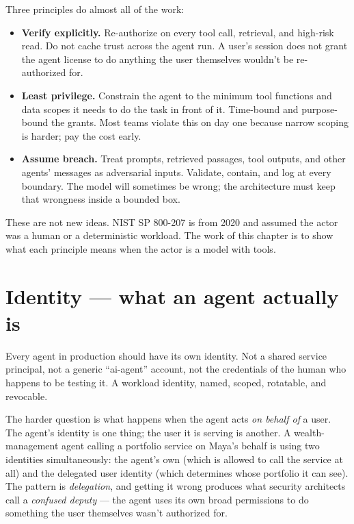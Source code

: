 Three principles do almost all of the work:

\begin{itemize}
\item \textbf{Verify explicitly.} Re-authorize on every tool call, retrieval, and high-risk read. Do not cache trust across the agent run. A user's session does not grant the agent license to do anything the user themselves wouldn't be re-authorized for.
\item \textbf{Least privilege.} Constrain the agent to the minimum tool functions and data scopes it needs to do the task in front of it. Time-bound and purpose-bound the grants. Most teams violate this on day one because narrow scoping is harder; pay the cost early.
\item \textbf{Assume breach.} Treat prompts, retrieved passages, tool outputs, and other agents' messages as adversarial inputs. Validate, contain, and log at every boundary. The model will sometimes be wrong; the architecture must keep that wrongness inside a bounded box.
\end{itemize}

These are not new ideas. NIST SP 800-207 is from 2020 and assumed the actor was a human or a deterministic workload. The work of this chapter is to show what each principle means when the actor is a model with tools.

\section{Identity --- what an agent actually is}

Every agent in production should have its own identity. Not a shared service principal, not a generic ``ai-agent'' account, not the credentials of the human who happens to be testing it. A workload identity, named, scoped, rotatable, and revocable.

The harder question is what happens when the agent acts \textit{on behalf of} a user. The agent's identity is one thing; the user it is serving is another. A wealth-management agent calling a portfolio service on Maya's behalf is using two identities simultaneously: the agent's own (which is allowed to call the service at all) and the delegated user identity (which determines whose portfolio it can see). The pattern is \textit{delegation}, and getting it wrong produces what security architects call a \textit{confused deputy} --- the agent uses its own broad permissions to do something the user themselves wasn't authorized for.

